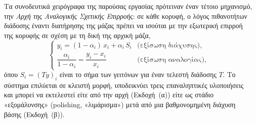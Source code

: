 \documentclass[11pt,a4paper]{article}
\theoremstyle{definition}
\theoremstyle{plain}
\begin{document}
Τα συνοδευτικά χειρόγραφα της παρούσας εργασίας πρότειναν έναν τέτοιο μηχανισμό, την \emph{Αρχή της Αναλογικής Σχετικής Επιρροής}: σε κάθε κορυφή, ο λόγος πιθανοτήτων διάδοσης έναντι διατήρησης της μάζας πρέπει να ισούται με την εξωτερική επιρροή της κορυφής σε σχέση με τη δική της αρχική μάζα,
\begin{equation}\label{eq:system}
\begin{cases}
y_i=(1-\alpha_i)\,x_i+\alpha_i\,S_i & \text{(εξίσωση διάχυσης)},\\[3pt]
\dfrac{\alpha_i}{1-\alpha_i}=\dfrac{y_i-x_i}{x_i} & \text{(εξίσωση αναλογίας)},
\end{cases}
\end{equation}
όπου $S_i=(Ty)_i$ είναι το σήμα των γειτόνων για έναν τελεστή διάδοσης $T$. Το σύστημα επιλύεται σε κλειστή μορφή, υποδεικνύει τρεις επαναληπτικές υλοποιήσεις και μπορεί να εκτελεστεί είτε από την αρχή (Εκδοχή~(α)) είτε ως στάδιο «εξομάλυνσης» (polishing, «λιμάρισμα») μετά από μια βαθμονομημένη διάχυση βάσης (Εκδοχή~(β)).
\end{document}
